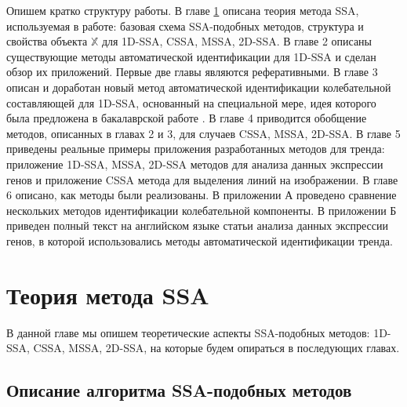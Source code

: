 \documentclass[specialist,
               substylefile = spbu.rtx,
               subf,href,colorlinks=true, 12pt]{disser}
\begin{document}
Опишем кратко структуру работы. В главе \ref{sec:ssa_theory} описана теория метода SSA, используемая в работе: базовая схема SSA-подобных методов, структура и свойства объекта $\mathbb{X}$ для 1D-SSA, CSSA, MSSA, 2D-SSA.
В главе 2 описаны существующие методы автоматической идентификации для 1D-SSA и сделан обзор их приложений.
Первые две главы являются реферативными. В главе 3 описан и  доработан новый метод автоматической идентификации колебательной составляющей для 1D-SSA, основанный на специальной мере, идея которого была предложена в бакалаврской работе \cite{Zhornikova2016}.
В главе 4 приводится обобщение методов, описанных в главах 2 и 3, для случаев CSSA, MSSA, 2D-SSA.
В главе 5 приведены реальные примеры приложения разработанных методов для тренда:
приложение 1D-SSA, MSSA, 2D-SSA методов для анализа данных экспрессии генов и приложение CSSA метода для выделения линий на изображении. В главе 6 описано, как методы были реализованы.
В приложении А проведено сравнение нескольких методов идентификации колебательной компоненты. В приложении Б приведен полный текст на английском языке статьи анализа данных экспрессии генов, в которой использовались методы автоматической идентификации тренда.


\chapter{Теория метода SSA}
\label{sec:ssa_theory}

В данной главе мы опишем теоретические аспекты SSA-подобных методов: 1D-SSA, CSSA, MSSA, 2D-SSA, на которые будем опираться в последующих главах.

\section{Описание алгоритма SSA-подобных методов}
\label{sec:ssa_alg}
\end{document}

